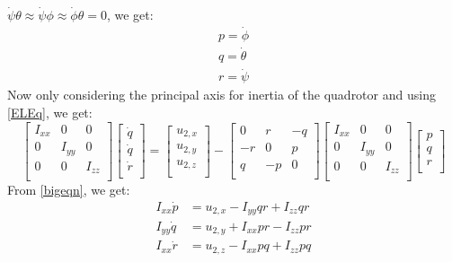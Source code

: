 \documentclass[conference,onecolumn,10pt]{IEEEtran}
\begin{document}
$\dot{\psi} \theta \approx \dot{\psi}\phi \approx \dot{\phi} \theta  = 0  $, 
we get: 
\begin{equation}
\label{jpayetehi}
\begin{aligned}
p = \dot{\phi} \\
q = \dot{\theta} \\
r = \dot{\psi}
\end{aligned}
\end{equation}
Now only considering the principal axis for inertia of the quadrotor and using \eqref{ELEq}, we get: 
\begin{equation}
\label{bigeqn}
\begin{bmatrix}
I_{xx} & 0 & 0\\
0 & I_{yy} & 0 \\
0 & 0 & I_{zz} \\
\end{bmatrix} \begin{bmatrix}
\dot{q} \\
\dot{q} \\
\dot{r} \\ 
\end{bmatrix} = \begin{bmatrix}
u_{2,x} \\
u_{2,y} \\
u_{2,z} \\
\end{bmatrix} - \begin{bmatrix}
0 & r & -q\\
-r& 0 & p \\
 q & -p & 0 \\
\end{bmatrix} \begin{bmatrix}
I_{xx} & 0 & 0\\
0 & I_{yy} & 0 \\
0 & 0 & I_{zz} \\
\end{bmatrix} \begin{bmatrix}
p \\
q \\
r \\
\end{bmatrix}
\end{equation}
From \eqref{bigeqn}, we get: 
\begin{equation}
\begin{aligned}
I_{xx}\dot{p} & = u_{2,x} - I_{yy}qr + I_{zz} qr \\ 
I_{yy}\dot{q} & = u_{2,y} + I_{xx}pr - I_{zz} pr \\
I_{xx}\dot{r} & = u_{2,z} - I_{xx}pq + I_{zz} pq \\
\end{aligned}
\end{equation}
\end{document}
